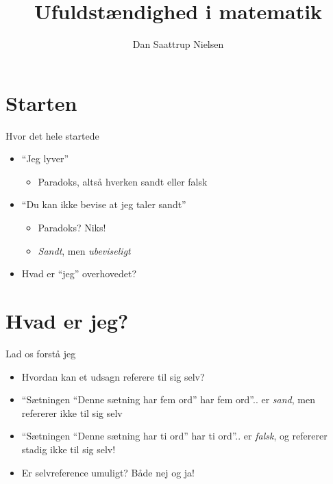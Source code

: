 \documentclass{beamer}
\title[Ufuldstæn-dighed]{Ufuldstændighed i matematik}
\author{Dan Saattrup Nielsen}
\date{}
\begin{document}
{

\begin{frame}
  \maketitle
\end{frame}}

\section{Starten}
\begin{frame}{Hvor det hele startede}
  \begin{itemize}
    \item ``Jeg lyver''
    \begin{itemize}
      \pause\item Paradoks, altså hverken sandt eller falsk
    \end{itemize}
    \pause\item ``Du kan ikke bevise at jeg taler sandt''
    \begin{itemize}
      \pause\item Paradoks? \pause Niks!
      \pause\item \textit{Sandt}, men \textit{ubeviseligt}
    \end{itemize}
    \pause\item Hvad er ``jeg'' overhovedet?
  \end{itemize}
\end{frame}

\section{Hvad er jeg?}
\begin{frame}{Lad os forstå jeg}
  \begin{itemize}
    \item Hvordan kan et udsagn referere til sig selv?
    \pause\item ``Sætningen ``Denne sætning har fem ord'' har fem ord''\pause .. er \textit{sand}, men refererer ikke til sig selv
    \pause\item ``Sætningen ``Denne sætning har ti ord'' har ti ord''\pause .. er \textit{falsk}, og refererer stadig ikke til sig selv!
    \pause\item Er selvreference umuligt? \pause Både nej og ja!
  \end{itemize}
\end{frame}
\end{document}
